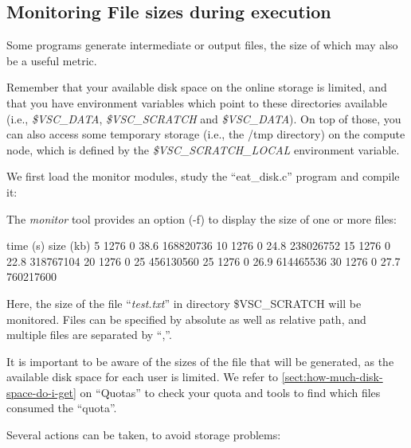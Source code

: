 \subsection{Monitoring File sizes during execution}

Some programs generate intermediate or output files, the size of which may also
be a useful metric.

Remember that your available disk space on the \hpc online storage is limited,
and that you have environment variables which point to these directories available
(i.e., \emph{\$VSC\_DATA}, \emph{\$VSC\_SCRATCH} and \emph{\$VSC\_DATA}).
On top of those, you can also access some temporary storage (i.e., the /tmp
directory) on the compute node, which is defined by the
\emph{\$VSC\_SCRATCH\_LOCAL} environment variable.

\ifgent
\else
  We first load the monitor modules, study the ``eat\_disk.c'' program and
  compile it:
  
  \begin{prompt}
  \end{prompt}
  
  The \emph{monitor} tool provides an option (-f) to display the size of one or
  more files:
  
  \begin{prompt}
  time (s) size (kb) %
  5  1276  0 38.6 168820736
  10  1276  0 24.8 238026752
  15  1276  0 22.8 318767104
  20  1276  0 25 456130560
  25  1276  0 26.9 614465536
  30  1276  0 27.7 760217600
  \end{prompt}
  
  Here, the size of the file ``\emph{test.txt}'' in directory \$VSC\_SCRATCH will
  be monitored. Files can be specified by absolute as well as relative path, and
  multiple files are separated by ``,''.
\fi

It is important to be aware of the sizes of the file that will be generated, as
the available disk space for each user is limited.  We refer to \autoref{sect:how-much-disk-space-do-i-get} on
``Quotas'' to check your quota and tools to find which files consumed the
``quota''.

Several actions can be taken, to avoid storage problems:

